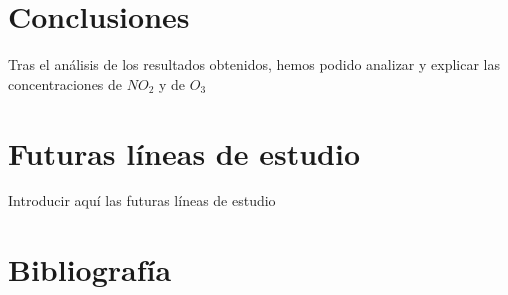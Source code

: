 \documentclass[12pt]{article}
\begin{document}
\newpage

\section{Conclusiones}

Tras el análisis de los resultados obtenidos, hemos podido analizar y explicar las concentraciones de $NO_{2}$ y de $O_{3}$ 

\newpage

\section{Futuras líneas de estudio}

Introducir aquí las futuras líneas de estudio

\newpage

\section{Bibliografía}
\end{document}
